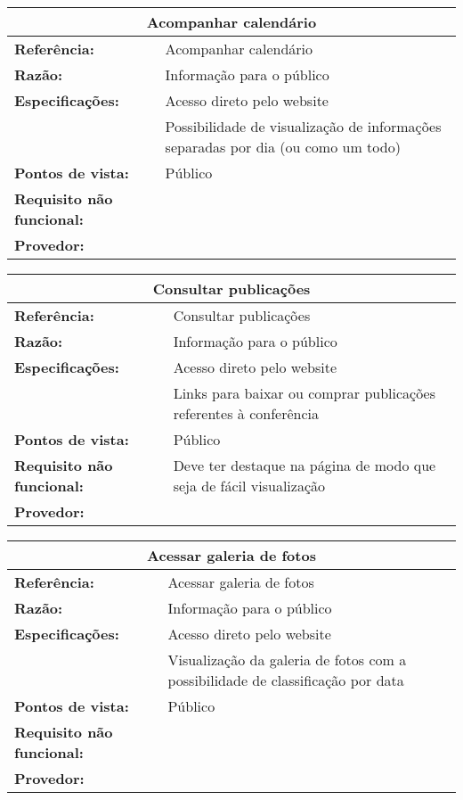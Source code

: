 \documentclass[letter]{article}
\begin{document}
\begin{flushleft}
%
\begin{table}[h!]\begin{center}
\begin{tabular}{|ll|}
\hline 
\multicolumn{2}{|c|}{\textbf{Acompanhar calendário}}\tabularnewline
\hline
\textbf{Referência:} & Acompanhar calendário\tabularnewline
\textbf{Razão:} & Informação para o público\tabularnewline
\textbf{Especificações:} & Acesso direto pelo website\tabularnewline
 & Possibilidade de visualização de informações separadas por dia (ou
como um todo)\tabularnewline
\textbf{Pontos de vista:} & Público\tabularnewline
\textbf{Requisito não funcional:} & \tabularnewline
\textbf{Provedor:} & \tabularnewline
\hline\end{tabular}\end{center}
\end{table}

\par\end{flushleft}

%
\begin{table}[h!]\begin{center}
\begin{tabular}{|ll|}
\hline 
\multicolumn{2}{|c|}{\textbf{Consultar publicações}}\tabularnewline
\hline
\textbf{Referência:} & Consultar publicações\tabularnewline
\textbf{Razão:} & Informação para o público\tabularnewline
\textbf{Especificações:} & Acesso direto pelo website\tabularnewline
 & Links para baixar ou comprar publicações referentes à conferência\tabularnewline
\textbf{Pontos de vista:} & Público\tabularnewline
\textbf{Requisito não funcional:} & Deve ter destaque na página de modo que seja de fácil visualização\tabularnewline
\textbf{Provedor:} & \tabularnewline
\hline\end{tabular}\end{center}
\end{table}


%
\begin{table}[h!]\begin{center}
\begin{tabular}{|ll|}
\hline 
\multicolumn{2}{|c|}{\textbf{Acessar galeria de fotos}}\tabularnewline
\hline
\textbf{Referência:} & Acessar galeria de fotos\tabularnewline
\textbf{Razão:} & Informação para o público\tabularnewline
\textbf{Especificações:} & Acesso direto pelo website\tabularnewline
 & Visualização da galeria de fotos com a possibilidade de classificação
por data\tabularnewline
\textbf{Pontos de vista:} & Público\tabularnewline
\textbf{Requisito não funcional:} & \tabularnewline
\textbf{Provedor:} & \tabularnewline
\hline\end{tabular}\end{center}
\end{table}
\end{document}
